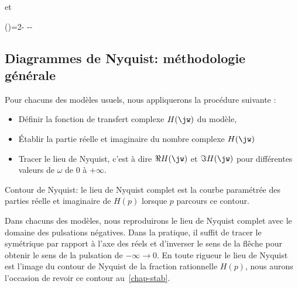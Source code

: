 et
\begin{bequation}
\phi(\omega)=2\arctan{\tau_3\omega}-\arctan{\tau_1\omega}
             -\arctan{\tau_2\omega}-\arctan{\tau_4\omega} 
\end{bequation}
\clearpage
{}
\captionsetup{width=0.9\linewidth}
\subsection{Diagrammes de Nyquist: méthodologie générale}
Pour chacuns des modèles usuels, nous appliquerons la procédure suivante :
\begin{itemize}
    \item Définir la fonction de transfert complexe $H(\jw)$ du modèle,
    \item \'Etablir la partie réelle et imaginaire du nombre complexe $H(\jw)$
    \item Tracer le lieu de Nyquist, c'est à dire $\Re{H(\jw)}$ et 
          $\Im{H(\jw)}$ pour différentes valeurs de $\omega$ de 0 à $+\infty$. 
\end{itemize}
\begin{marginfigure}
    \centering
    
    \caption{Contour de Nyquist: le lieu de Nyquist complet est 
             la courbe paramétrée des parties réelle et imaginaire 
             de $H(p)$ lorsque $p$ parcours ce contour.}
\end{marginfigure}
Dans chacuns des modèles, nous reproduirons le lieu de Nyquist 
complet avec le domaine des pulsations négatives. Dans la pratique, il suffit 
de tracer le symétrique par rapport à 
l'axe des réels et d'inverser le sens de la flêche pour obtenir le sens de la 
pulsation de $-\infty\to 0$. 
En toute rigueur le lieu de Nyquist est l'image du contour de Nyquist de la 
fraction rationnelle $H(p)$, nous aurons l'occasion de revoir ce contour
au~\cref{chap-stab}.    
